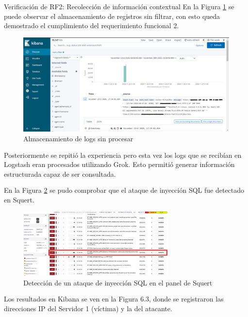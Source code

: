 \begin{section}{Verificación de RF2: Recolección de información contextual}
    En la Figura \ref{fig:iter2_logs_crudos} se puede observar el almacenamiento de registros sin filtrar, con esto queda demostrado el cumplimiento del requerimiento funcional 2.
    \begin{figure}[H]
    \centering
    \includegraphics[width=1\textwidth]{./iteracion_2_imagenes/1_kibana_logs_1EDITADA.png}
    \caption{Almacenamiento de logs sin procesar}
    \label{fig:iter2_logs_crudos}
    \end{figure}
    \FloatBarrier
    Posteriormente se repitió la experiencia pero esta vez los logs que se recibían en Logstash eran procesados utilizando Grok. Esto permitió generar información estructurada capaz de ser consultada. \par
    En la Figura \ref{fig:figura_squert-sql} se pudo comprobar que el ataque de inyección SQL fue detectado en Squert.
    \begin{figure}[H]
    \centering
    \includegraphics[width=0.7\textwidth]{./iteracion_2_imagenes/squert-sql-injection.png}
    \caption{Detección de un ataque de inyección SQL en el panel de Squert}
    \label{fig:figura_squert-sql}
    \end{figure}
    Los resultados en Kibana se ven en la Figura 6.3, donde se registraron las direcciones IP del Servidor 1 (víctima) y la del atacante. \par
    \begin{figure}[H]
    \centering

\end{figure}
\end{section}
